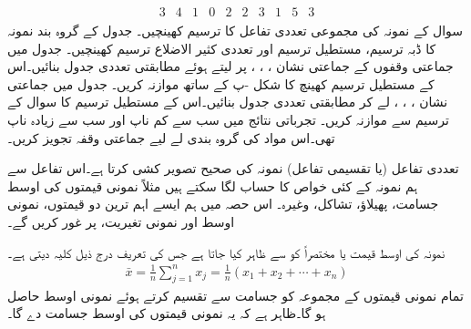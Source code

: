 \begin{align*}
\begin{array}{rrrrrrrrrr}
3&4&1&0&2&2&3&1&5&3
\end{array}
\end{align*}
\quad
سوال  کے نمونہ کی مجموعی تعددی تفاعل کا ترسیم کھینچیں۔
\quad
جدول  کے گروہ بند نمونہ کا ڈبہ ترسیم، مستطیل ترسیم اور تعددی کثیر الاضلاع ترسیم کھینچیں۔ 
\quad
جدول  میں جماعتی وقفوں کے جماعتی نشان ، ، ،  پر لیتے ہوئے مطابقتی تعددی جدول بنائیں۔اس کے مستطیل ترسیم کھینچ کا شکل -پ کے ساتھ موازنہ کریں۔
\quad
جدول  میں جماعتی نشان ، ، ،  لے کر مطابقتی تعددی جدول بنائیں۔اس کے مستطیل ترسیم کا سوال  کے ترسیم سے موازنہ کریں۔  
\quad
{} تجرباتی نتائج میں سب سے کم ناپ  اور سب سے زیادہ ناپ  تھی۔اس مواد کی گروہ بندی لے لیے جماعتی وقفہ تجویز کریں۔

تعددی تفاعل (یا تقسیمی تفاعل) نمونہ کی صحیح تصویر کشی کرتا ہے۔اس تفاعل سے ہم نمونہ کے کئی خواص کا حساب لگا سکتے ہیں مثلاً نمونی قیمتوں کی اوسط جسامت، پھیلاؤ، تشاکل، وغیرہ۔ اس حصہ میں ہم ایسے اہم ترین دو قیمتوں، نمونی اوسط اور نمونی تغیریت، پر غور کریں گے۔

نمونہ  کی اوسط قیمت یا مختصراً  کو  سے ظاہر کیا جاتا ہے جس کی تعریف درج ذیل کلیہ دیتی ہے۔
\begin{align}\label{مساوات_شماریات_نمونی_اوسط_الف}
\bar{x}=\frac{1}{n}\sum_{j=1}^{n}x_j=\frac{1}{n}(x_1+x_2+\cdots+x_n)
\end{align}
تمام نمونی قیمتوں کے مجموعہ کو جسامت  سے تقسیم کرتے ہوئے نمونی اوسط حاصل ہو گا۔ظاہر ہے کہ یہ نمونی قیمتوں کی اوسط جسامت دے گا۔

